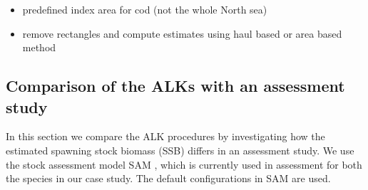 \documentclass[a4paper 12pt]{article}
\numberwithin{equation}{section}
\begin{document}
\begin{itemize}
\item predefined index area for cod (not the whole North sea)
\item remove rectangles and compute estimates using haul based or area based method
\end{itemize}
\clearpage
%





 \subsection{Comparison of the ALKs with an assessment study}
 In this section we compare the ALK procedures by investigating how the estimated spawning stock biomass (SSB) differs in an assessment study. We use the stock assessment model SAM \citep{nielsen2014estimation}, which is currently used in assessment for both the species in our case study. The default configurations in SAM are used. 
 
\end{document}

